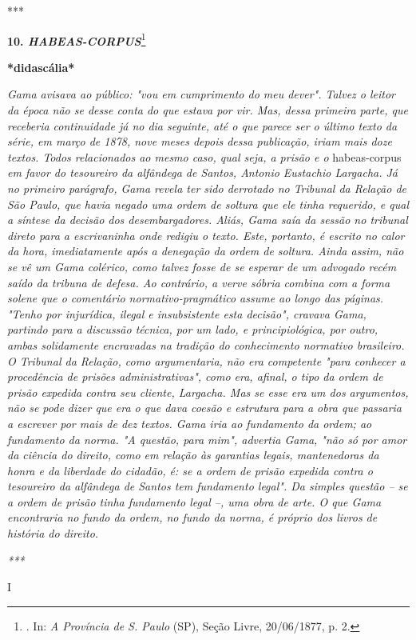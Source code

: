 ***

\textbf{10. \emph{HABEAS-CORPUS}}\footnote{. In: \emph{A Província de S.
  Paulo} (SP), Seção Livre, 20/06/1877, p. 2.}

\textbf{*didascália*}

\emph{Gama avisava ao público: "vou em cumprimento do meu dever". Talvez
o leitor da época não se desse conta do que estava por vir. Mas, dessa
primeira parte, que receberia continuidade já no dia seguinte, até o que
parece ser o último texto da série, em março de 1878, nove meses depois
dessa publicação, iriam mais doze textos. Todos relacionados ao mesmo
caso, qual seja, a prisão e o} habeas-corpus \emph{em favor do
tesoureiro da alfândega de Santos, Antonio Eustachio Largacha. Já no
primeiro parágrafo, Gama revela ter sido derrotado no Tribunal da
Relação de São Paulo, que havia negado uma ordem de soltura que ele
tinha requerido, e qual a síntese da decisão dos desembargadores. Aliás,
Gama saía da sessão no tribunal direto para a escrivaninha onde redigiu
o texto. Este, portanto, é escrito no calor da hora, imediatamente após
a denegação da ordem de soltura. Ainda assim, não se vê um Gama
colérico, como talvez fosse de se esperar de um advogado recém saído da
tribuna de defesa. Ao contrário, a verve sóbria combina com a forma
solene que o comentário normativo-pragmático assume ao longo das
páginas. "Tenho por injurídica, ilegal e insubsistente esta decisão",
cravava Gama, partindo para a discussão técnica, por um lado, e
principiológica, por outro, ambas solidamente encravadas na tradição do
conhecimento normativo brasileiro. O Tribunal da Relação, como
argumentaria, não era competente "para conhecer a procedência de prisões
administrativas", como era, afinal, o tipo da ordem de prisão expedida
contra seu cliente, Largacha. Mas se esse era um dos argumentos, não se
pode dizer que era o que dava coesão e estrutura para a obra que
passaria a escrever por mais de dez textos. Gama iria ao fundamento da
ordem; ao fundamento da norma. "A questão, para mim", advertia Gama,
"não só por amor da ciência do direito, como em relação às garantias
legais, mantenedoras da honra e da liberdade do cidadão, é: se a ordem
de prisão expedida contra o tesoureiro da alfândega de Santos tem
fundamento legal". Da simples questão -- se a ordem de prisão tinha
fundamento legal --, uma obra de arte. O que Gama encontraria no fundo
da ordem, no fundo da norma, é próprio dos livros de história do
direito.}

\emph{***}

I

